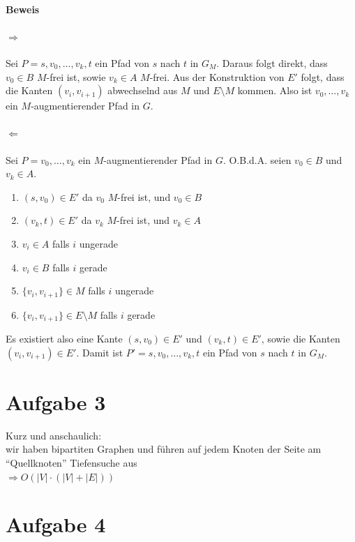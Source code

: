 \documentclass[10pt,a4paper]{article}
\begin{document}
\paragraph{Beweis}

\paragraph{$\Rightarrow$}
Sei $P = s, v_0, \ldots, v_k, t$ ein Pfad von $s$ nach $t$ in $G_M$.
Daraus folgt direkt, dass $v_0 \in B$ $M$-frei ist, sowie $v_k \in A$ $M$-frei.
Aus der Konstruktion von $E'$ folgt, dass die Kanten $(v_i, v_{i+1})$ abwechselnd aus $M$ und $E \setminus M$ kommen.
Also ist $v_0, \ldots, v_k$ ein $M$-augmentierender Pfad in $G$.

\paragraph{$\Leftarrow$}
Sei $P = v_0, \ldots, v_k$ ein $M$-augmentierender Pfad in $G$. O.B.d.A. seien $v_0 \in B$ und $v_k \in A$.
\begin{enumerate}
	\item $(s, v_0) \in E'$ da $v_0$ $M$-frei ist, und $v_0 \in B$
	\item $(v_k, t) \in E'$ da $v_k$ $M$-frei ist, und $v_k \in A$
	\item $v_i \in A$ falls $i$ ungerade
	\item $v_i \in B$ falls $i$ gerade
	\item $\{v_i, v_{i+1}\} \in M$ falls $i$ ungerade
	\item $\{v_i, v_{i+1}\} \in E \setminus M$ falls $i$ gerade
\end{enumerate}
Es existiert also eine Kante $(s, v_0) \in E'$ und $(v_k, t) \in E'$,
sowie die Kanten $(v_i, v_{i+1}) \in E'$.
Damit ist $P' = s, v_0, \ldots, v_k, t $ ein Pfad von $s$ nach $t$ in $G_M$.


\section*{Aufgabe 3}
    
    Kurz und anschaulich: \\
    wir haben bipartiten Graphen und führen auf jedem
    Knoten der Seite am ``Quellknoten'' Tiefensuche aus \\
    $\Rightarrow O(|V| \cdot (|V| + |E|))$
    

\section*{Aufgabe 4}
\end{document}
